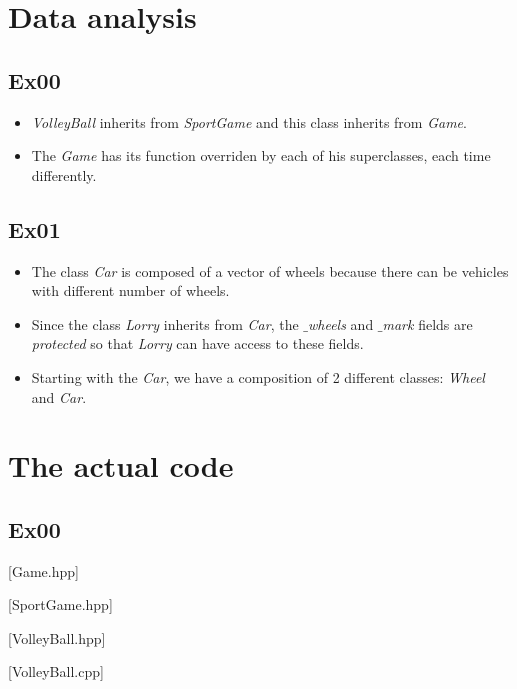 \documentclass{article}
\begin{document}
	\section{Data analysis}
		\subsection{Ex00}
		\begin{itemize}
			\item \textit{VolleyBall} inherits from \textit{SportGame} and this class inherits from \textit{Game}.

			\item The \textit{Game} has its function  overriden by each of his superclasses, each time differently.
		\end{itemize}

		\subsection{Ex01}
		\begin{itemize}
			\item The class \textit{Car} is composed of a vector of wheels because there can be vehicles with different number of wheels.

			\item Since the class \textit{Lorry} inherits from \textit{Car}, the \textit{$\_$wheels} and \textit{$\_$mark} fields are \textit{protected} so that \textit{Lorry} can have access to these fields.

			\item Starting with the \textit{Car}, we have a composition of 2 different classes: \textit{Wheel} and \textit{Car}.
		\end{itemize}

	\section{The actual code}
		\subsection{Ex00}
		\begin{center}
			\begin{minipage}{\linewidth}
				[Game.hpp]
			\end{minipage}

			\begin{minipage}{\linewidth}
				[SportGame.hpp]
			\end{minipage}

			\begin{minipage}{\linewidth}
				[VolleyBall.hpp]
			\end{minipage}

			\begin{minipage}{\linewidth}
				[VolleyBall.cpp]
			\end{minipage}
		\end{center}
\end{document}

